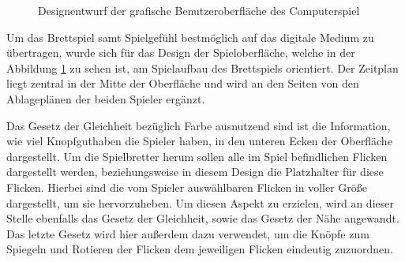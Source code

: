 \begin{figure}[!ht]
    \centering
    \caption{Designentwurf der grafische Benutzeroberfläche des Computerspiel}
    \label{fig:design-game-ui}
\end{figure}

Um das Brettspiel samt Spielgefühl bestmöglich auf das digitale Medium zu übertragen, wurde sich für das Design der Spieloberfläche, welche in der Abbildung \ref{fig:design-game-ui} zu sehen ist, am Spielaufbau des Brettspiels orientiert. Der Zeitplan liegt zentral in der Mitte der Oberfläche und wird an den Seiten von den Ablageplänen der beiden Spieler ergänzt.

Das Gesetz der Gleichheit bezüglich Farbe ausnutzend sind ist die Information, wie viel Knopfguthaben die Spieler haben, in den unteren Ecken der Oberfläche dargestellt. Um die Spielbretter herum sollen alle im Spiel befindlichen Flicken dargestellt werden, beziehungsweise in diesem Design die Platzhalter für diese Flicken. Hierbei sind die vom Spieler auswählbaren Flicken in voller Größe dargestellt, um sie hervorzuheben. Um diesen Aspekt zu erzielen, wird an dieser Stelle ebenfalls das Gesetz der Gleichheit, sowie das Gesetz der Nähe angewandt. Das letzte Gesetz wird hier außerdem dazu verwendet, um die Knöpfe zum Spiegeln und Rotieren der Flicken dem jeweiligen Flicken eindeutig zuzuordnen.

